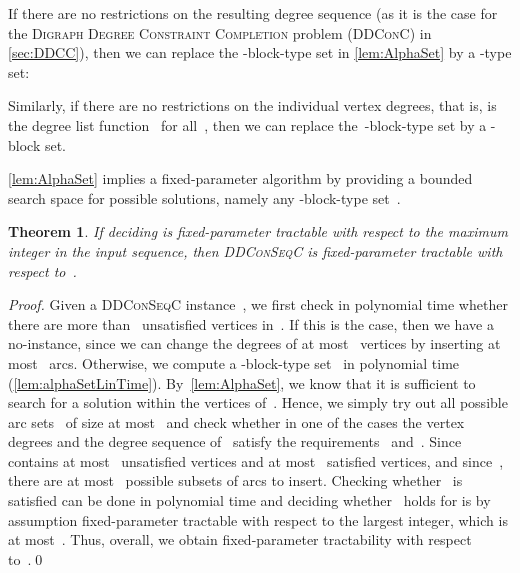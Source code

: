 \documentclass[a4paper,11pt]{article}
\theoremstyle{remark}
\theoremstyle{plain}
\newtheorem{theorem}{Theorem}
\newtheorem{lemma}[theorem]{Lemma}
\theoremstyle{definition}
\newcommand{\DDCSC}{\textsc{DDConSeqC}\xspace}
\newcommand{\DDCClong}{\textsc{Digraph Degree Constraint Completion}\xspace}
\newcommand{\DDCC}{\textsc{DDConC}\xspace}
\begin{document}
If there are no restrictions on the resulting degree sequence (as it is the case for the \DDCClong problem (\DDCC) in \cref{sec:DDCC}), then we can replace the -block-type set in \cref{lem:AlphaSet} by a -type set:

Similarly, if there are no restrictions on the individual vertex degrees, that is,  is the degree list function~ for all~,
then we can replace the~-block-type set by a -block set.


\cref{lem:AlphaSet} implies a fixed-parameter algorithm by providing a bounded search space for possible solutions, namely any -block-type set~.

\begin{theorem}\label{thm:PiEAfptDeltak}
  If deciding  is fixed-parameter tractable with respect to the maximum integer in the input sequence, then \DDCSC is fixed-parameter tractable with respect to~.
\end{theorem}

\begin{proof}
  Given a \DDCSC instance~, we first check in polynomial time whether there are more than~ unsatisfied vertices in~. If this is the case, then we have a no-instance, since we can change the degrees of at most~ vertices by inserting at most~ arcs.
  Otherwise, we compute a -block-type set~ in polynomial time (\cref{lem:alphaSetLinTime}).
  By~\cref{lem:AlphaSet}, we know that it is sufficient to search for a solution within the vertices of~. Hence, we simply try out all possible arc sets~ of size at most~ and check whether in one of the cases the vertex degrees and the degree sequence of~ satisfy the requirements~ and~.
  Since~ contains at most~ unsatisfied vertices and at most~ satisfied vertices, and since~, there are at most~ possible subsets of arcs to insert.
  Checking whether~ is satisfied can be done in polynomial time and deciding whether~ holds for  is by assumption fixed-parameter tractable with respect to the largest integer, which is at most~.
Thus, overall, we obtain fixed-parameter tractability with respect to~.\qed
\end{proof}
\end{document}
